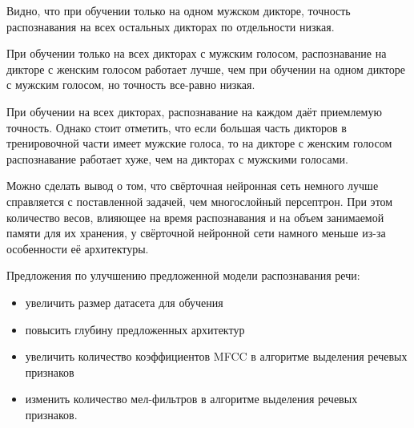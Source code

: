 Видно, что при обучении только на одном мужском дикторе, точность распознавания на всех остальных дикторах по отдельности низкая. 

При обучении только на всех дикторах с мужским голосом, распознавание на дикторе с женским голосом работает лучше, чем при обучении на одном дикторе с мужским голосом, но точность все-равно низкая.

При обучении на всех дикторах, распознавание на каждом даёт приемлемую точность. Однако стоит отметить, что если большая часть дикторов в тренировочной части имеет мужские голоса, то на дикторе с женским голосом распознавание работает хуже, чем на дикторах с мужскими голосами.

Можно сделать вывод о том, что свёрточная нейронная сеть немного лучше справляется с поставленной задачей, чем многослойный персептрон. При этом количество весов, влияющее на время распознавания и на объем занимаемой памяти для их хранения, у свёрточной нейронной сети намного меньше из-за особенности её архитектуры.

Предложения по улучшению предложенной модели распознавания речи:
\begin{itemize}[leftmargin=2cm]
	\item увеличить размер датасета для обучения
	\item повысить глубину предложенных архитектур
	\item увеличить количество коэффициентов MFCC в алгоритме выделения речевых признаков
	\item изменить количество мел-фильтров в алгоритме выделения речевых признаков.
\end{itemize}